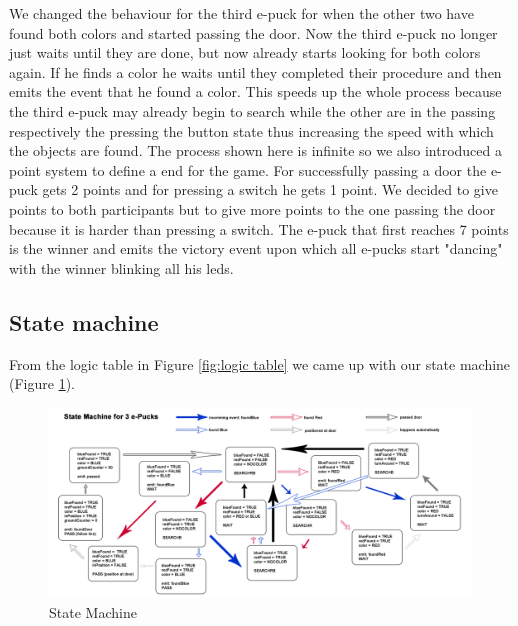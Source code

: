 \documentclass[12pt,a4paper]{article}
\begin{document}
\noindent We changed the behaviour for the third e-puck for when the other two have found both colors and started passing the door. Now the third e-puck no longer just waits until they are done, but now already starts looking for both colors again. If he finds a color he waits until they completed their procedure and then emits the event that he found a color. This speeds up the whole process because the third e-puck may already begin to search while the other are in the passing respectively the pressing the button state thus increasing the speed with which the objects are found. The process shown here is infinite so we also introduced a point system to define a end for the game.
For successfully passing a door the e-puck gets 2 points and for pressing a switch he gets 1 point. We decided to give points to both participants but to give more points to the one passing the door because it is harder than pressing a switch. The e-puck that first reaches 7 points is the winner and emits the victory event upon which all e-pucks start "dancing" with the winner blinking all his leds.

\subsection{State machine}
From the logic table in Figure \ref{fig:logic table} we came up with our state machine (Figure \ref{fig:State Machine}).

\begin{figure}[h!]
\begin{center}
\includegraphics[width = \linewidth]{images/StateMachine.png}
\caption{State Machine}
\label{fig:State Machine}
\end{center}
\end{figure}
\end{document}
